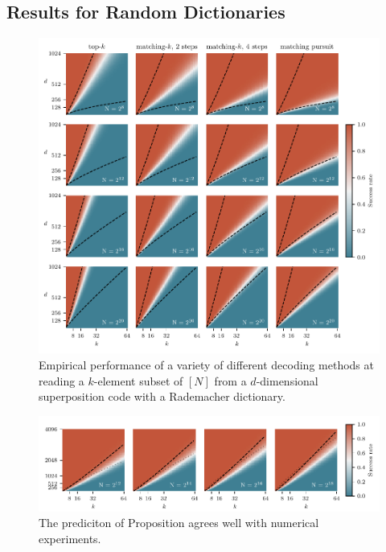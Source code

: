 \subsection{Results for Random Dictionaries \label{sec:random-results}}

\begin{figure}
	\begin{center}
	\includegraphics[width=\textwidth]{../figures/pursuit}
	\caption{Empirical performance of a variety of different decoding methods at reading a $k$-element subset of $[N]$ from a $d$-dimensional superposition code with a Rademacher dictionary.}
	\label{fig:pursuit}
	\end{center}
\end{figure}

\begin{figure}
	\begin{center}
	\includegraphics[width=\textwidth]{../figures/top_k}
	\caption{The prediciton of Proposition  agrees well with numerical experiments.}
	\label{fig:top-k}
	\end{center}
\end{figure}

